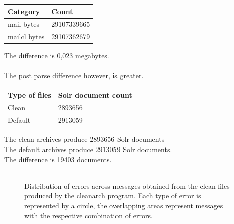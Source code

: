 \documentclass[a4paper,english]{report}
\begin{document}
\begin{center}
\begin{tabular}{||p{2cm}|p{2cm}||} 
\hline
Category & Count\\

\hline
mail  bytes  & 29107339665\\
\hline
mailcl bytes & 29107362679\\
\hline

\end{tabular}
\end{center}




The difference is 0,023 megabytes.\\\\
\noindent
The post parse difference however, is greater.\\




\begin{center}
\begin{tabular}{||p{2cm}|p{5cm}||} 
\hline
Type of files & Solr document count\\

\hline
Clean   & 2893656\\
\hline
Default & 2913059\\
\hline

\end{tabular}
\end{center}






The clean archives produce 2893656 Solr documents \\
The default archives produce 2913059 Solr documents.\\
The difference is 19403 documents.\\\\



\begin{figure}[H]
\caption{Distribution of errors across messages obtained from the clean files produced by the cleanarch program.  Each type of error is represented by a circle, the overlapping areas represent messages with the respective combination of errors.}
\end {figure}
\end{document}
